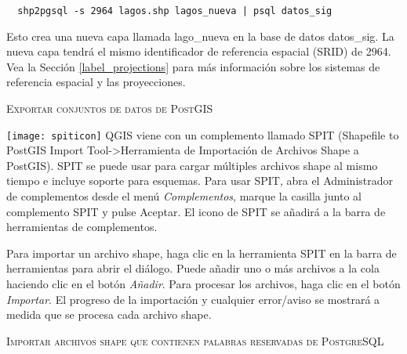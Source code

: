 \begin{verbatim} 
  shp2pgsql -s 2964 lagos.shp lagos_nueva | psql datos_sig
\end{verbatim}

Esto crea una nueva capa llamada lago\_nueva en la base de datos datos\_sig. La nueva capa tendrá el mismo identificador de referencia espacial (SRID) de 2964. Vea la Sección \ref{label_projections} para más información sobre los sistemas de referencia espacial y las proyecciones.
\begin{Tip}
\caption{\textsc{Exportar conjuntos de datos de PostGIS}}
\end{Tip}

\texttt{[image: spiticon]} QGIS viene con un complemento llamado SPIT (Shapefile to PostGIS Import Tool->Herramienta de Importación de Archivos Shape a PostGIS). SPIT se puede usar para cargar múltiples archivos shape al mismo tiempo e incluye soporte para esquemas. Para usar SPIT, abra el Administrador de complementos desde el menú \textit{Complementos}, marque la casilla junto al complemento SPIT y pulse Aceptar. El icono de SPIT se añadirá a la barra de herramientas de complementos.

Para importar un archivo shape, haga clic en la herramienta SPIT en la barra de herramientas para abrir el diálogo. Puede añadir uno o más archivos a la cola haciendo clic en el botón \textsl{Añadir}. Para procesar los archivos, haga clic  en el botón \textsl{Importar}. El progreso de la importación y cualquier error/aviso se mostrará a medida que se procesa cada archivo shape.

\begin{Tip}\caption{\textsc{Importar archivos shape que contienen palabras reservadas de PostgreSQL}}
\end{Tip} 

